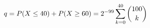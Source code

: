 \documentclass[preview]{standalone}
\begin{document}
\begin{align*}
\special{dvisvgm:raw <g id='unique000'>}q=P(X\le40)+P(X\ge60)=2^{-99}\sum_{k=0}^{40}\binom{100}{k}\special{dvisvgm:raw </g>}
\end{align*}
\end{document}
